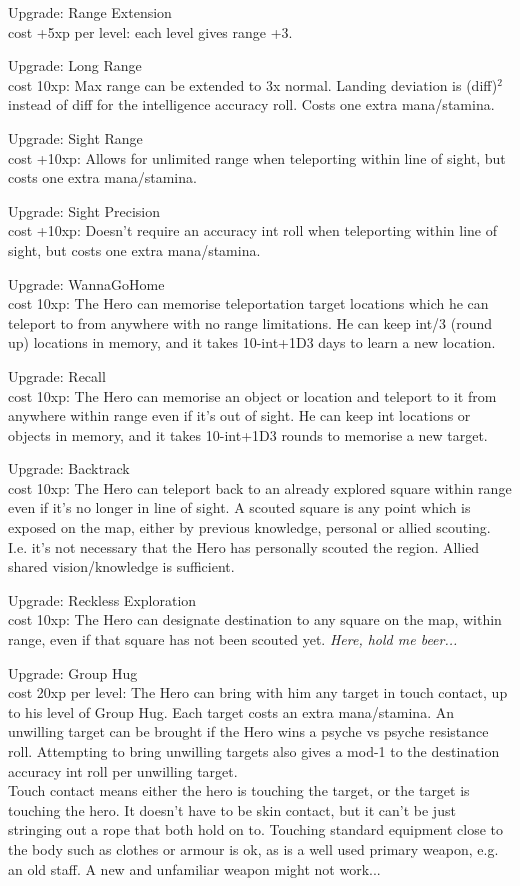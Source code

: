 Upgrade: Range Extension\\
cost +5xp per level: each level gives range +3.

Upgrade: Long Range\\
cost 10xp: Max range can be extended to 3x normal. Landing deviation is (diff)$^2$ instead of diff for the intelligence accuracy roll. Costs one extra mana/stamina.

Upgrade: Sight Range\\
cost +10xp: Allows for unlimited range when teleporting within line of sight, but costs one extra mana/stamina.

Upgrade: Sight Precision\\
cost +10xp: Doesn't require an accuracy int roll when teleporting within line of sight, but costs one extra mana/stamina.

Upgrade: WannaGoHome\\
cost 10xp: The Hero can memorise teleportation target locations which he can teleport to from anywhere with no range limitations. He can keep int/3 (round up) locations in memory, and it takes 10-int+1D3 days to learn a new location.

Upgrade: Recall\\
cost 10xp: The Hero can memorise an object or location and teleport to it from anywhere within range even if it's out of sight. He can keep int locations or objects in memory, and it takes 10-int+1D3 rounds to memorise a new target.

Upgrade: Backtrack\\
cost 10xp: The Hero can teleport back to an already explored square within range even if it's no longer in line of sight. A scouted square is any point which is exposed on the map, either by previous knowledge, personal or allied scouting. I.e. it's not necessary that the Hero has personally scouted the region. Allied shared vision/knowledge is sufficient.

Upgrade: Reckless Exploration\\
cost 10xp: The Hero can designate destination to any square on the map, within range, even if that square has not been scouted yet. \emph{Here, hold me beer...}

Upgrade: Group Hug\\
cost 20xp per level: The Hero can bring with him any target in touch contact, up to his level of Group Hug. Each target costs an extra mana/stamina. An unwilling target can be brought if the Hero wins a psyche vs psyche resistance roll. Attempting to bring unwilling targets also gives a mod-1 to the destination accuracy int roll per unwilling target.\\
Touch contact means either the hero is touching the target, or the target is touching the hero. It doesn't have to be skin contact, but it can't be just stringing out a rope that both hold on to. Touching standard equipment close to the body such as clothes or armour is ok, as is a well used primary weapon, e.g. an old staff. A new and unfamiliar weapon might not work...



